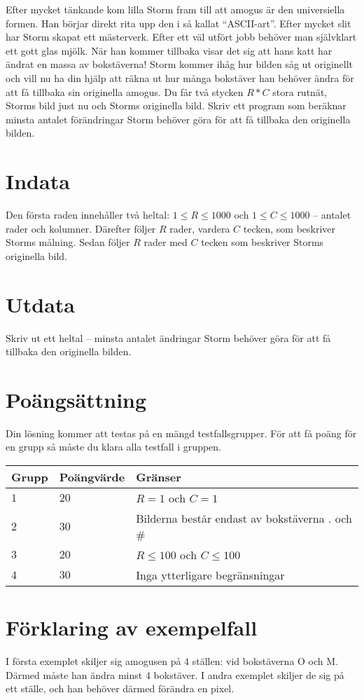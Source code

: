 Efter mycket tänkande kom lilla Storm fram till att amogus är den universiella formen. Han börjar direkt rita upp den
i så kallat ``ASCII-art''. Efter mycket slit har Storm skapat ett mästerverk. Efter ett väl utfört jobb behöver man
självklart ett gott glas mjölk. När han kommer tillbaka visar det sig att hans katt har ändrat en massa av bokstäverna!
Storm kommer ihåg hur bilden såg ut originellt och vill nu ha din hjälp att räkna ut hur många bokstäver han behöver ändra
för att få tillbaka sin originella amogus.
Du får två stycken $R*C$ stora rutnät, Storms bild just nu och Storms originella bild. Skriv ett program som beräknar
minsta antalet förändringar Storm behöver göra för att få tillbaka den originella bilden.

\section*{Indata}
Den första raden innehåller två heltal: $1\leq R \leq 1000$ och $1 \leq C \leq 1000$ -- antalet rader och kolumner.
Därefter följer $R$ rader, vardera $C$ tecken, som beskriver Storms målning. 
Sedan följer $R$ rader med $C$ tecken som beskriver Storms originella bild. 

\section*{Utdata}
Skriv ut ett heltal -- minsta antalet ändringar Storm behöver göra för att få tillbaka den originella bilden.

\section*{Poängsättning}
Din lösning kommer att testas på en mängd testfallsgrupper.
För att få poäng för en grupp så måste du klara alla testfall i gruppen.

\noindent
\begin{tabular}{| l | l | p{12cm} |}
  \hline
  Grupp & Poängvärde & Gränser \\ \hline
  $1$   & $20$       & $R=1$ och $C=1$ \\ \hline
  $2$   & $30$       & Bilderna består endast av bokstäverna . och \#\\ \hline
  $3$   & $20$       & $R \leq 100$ och $C \leq 100$  \\ \hline
  $4$   & $30$       & Inga ytterligare begränsningar  \\ \hline
\end{tabular}

\section*{Förklaring av exempelfall}
I första exemplet skiljer sig amogusen på 4 ställen: vid bokstäverna O och M. Därmed måste han ändra minst 4 bokstäver.
I andra exemplet skiljer de sig på ett ställe, och han behöver därmed förändra en pixel.
